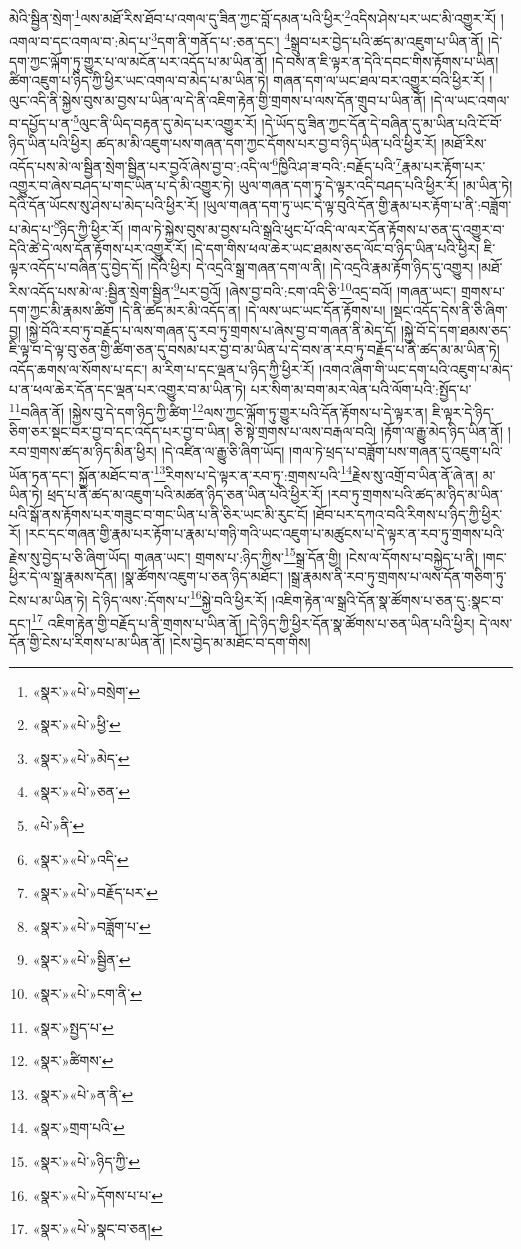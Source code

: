 མེའི་སྦྱིན་སྲེག་\footnote{«སྣར་»«པེ་»བསྲེག་}ལས་མཐོ་རིས་ཐོབ་པ་འགལ་དུ་ཟིན་ཀྱང་བློ་དམན་པའི་ཕྱིར་\footnote{«སྣར་»«པེ་»ཕྱི་}འདིས་ཤེས་པར་ཡང་མི་འགྱུར་རོ། །འགལ་བ་དང་འགལ་བ་:མེད་པ་\footnote{«སྣར་»«པེ་»མེད་}དག་ནི་གནོད་པ་:ཅན་དང་། \footnote{«སྣར་»«པེ་»ཅན་}སྒྲུབ་པར་བྱེད་པའི་ཚད་མ་འཇུག་པ་ཡིན་ནོ། །དེ་དག་ཀྱང་ལྐོག་ཏུ་གྱུར་པ་ལ་མངོན་པར་འདོད་པ་མ་ཡིན་ནོ། །དེ་བས་ན་ཇི་ལྟར་ན་དེའི་དབང་གིས་རྟོགས་པ་ཡིན། ཚིག་འཇུག་པ་ཉིད་ཀྱི་ཕྱིར་ཡང་འགལ་བ་མེད་པ་མ་ཡིན་ཏེ། གཞན་དག་ལ་ཡང་ཐལ་བར་འགྱུར་བའི་ཕྱིར་རོ། །ལུང་འདི་ནི་སྐྱེས་བུས་མ་བྱས་པ་ཡིན་ལ་དེ་ནི་འཇིག་རྟེན་གྱི་གྲགས་པ་ལས་དོན་གྲུབ་པ་ཡིན་ནོ། །དེ་ལ་ཡང་འགལ་བ་དཔྱོད་པ་ན་\footnote{«པེ་»ནི་}ལུང་ནི་ཡིད་བརྟན་དུ་མེད་པར་འགྱུར་རོ། །དེ་ཡོད་དུ་ཟིན་ཀྱང་དོན་དེ་བཞིན་དུ་མ་ཡིན་པའི་ངོ་བོ་ཉིད་ཡིན་པའི་ཕྱིར། ཚད་མ་མི་འཇུག་པས་གཞན་དག་ཀྱང་དོགས་པར་བྱ་བ་ཉིད་ཡིན་པའི་ཕྱིར་རོ། །མཐོ་རིས་འདོད་པས་མེ་ལ་སྦྱིན་སྲེག་སྦྱིན་པར་བྱའོ་ཞེས་བྱ་བ་:འདི་ལ་\footnote{«སྣར་»«པེ་»འདི་}ཁྱིའི་ཤ་ཟ་བའི་:བརྗོད་པའི་\footnote{«སྣར་»«པེ་»བརྗོད་པར་}རྣམ་པར་རྟོག་པར་འགྱུར་བ་ཞེས་བཤད་པ་གང་ཡིན་པ་དེ་མི་འགྱུར་ཏེ། ཡུལ་གཞན་དག་ཏུ་དེ་ལྟར་འདི་བཤད་པའི་ཕྱིར་རོ། །མ་ཡིན་ཏེ། དེའི་དོན་ཡོངས་སུ་ཤེས་པ་མེད་པའི་ཕྱིར་རོ། །ཡུལ་གཞན་དག་ཏུ་ཡང་དེ་ལྟ་བུའི་དོན་གྱི་རྣམ་པར་རྟོག་པ་ནི་:བཟློག་པ་མེད་པ་\footnote{«སྣར་»«པེ་»བཟློག་པ་}ཉིད་ཀྱི་ཕྱིར་རོ། །གལ་ཏེ་སྐྱེས་བུས་མ་བྱས་པའི་སྒྲའི་ཕུང་པོ་འདི་ལ་ལར་དོན་རྟོགས་པ་ཅན་དུ་འགྱུར་བ་དེའི་ཚེ་དེ་ལས་དོན་རྟོགས་པར་འགྱུར་རོ། །དེ་དག་གིས་ཕལ་ཆེར་ཡང་ཐམས་ཅད་ལོང་བ་ཉིད་ཡིན་པའི་ཕྱིར། ཇི་ལྟར་འདོད་པ་བཞིན་དུ་བྱེད་དོ། །དེའི་ཕྱིར། དེ་འདྲའི་སྒྲ་གཞན་དག་ལ་ནི། །དེ་འདྲའི་རྣམ་རྟོག་ཉིད་དུ་འགྱུར། །མཐོ་རིས་འདོད་པས་མེ་ལ་:སྦྱིན་སྲེག་སྦྱིན་\footnote{«སྣར་»«པེ་»སྦྱིན་}པར་བྱའོ། །ཞེས་བྱ་བའི་:ངག་འདི་ཅི་\footnote{«སྣར་»«པེ་»ངག་ནི་}འདྲ་བའོ། །གཞན་ཡང་། གྲགས་པ་དག་ཀྱང་མི་རྣམས་ཚིག །དེ་ནི་ཚད་མར་མི་འདོད་ན། །དེ་ལས་ཡང་ཡང་དོན་རྟོགས་པ། །སྡང་འདོད་དེས་ནི་ཅི་ཞིག་བྱ། །སྐྱེ་བོའི་རབ་ཏུ་བརྗོད་པ་ལས་གཞན་དུ་རབ་ཏུ་གྲགས་པ་ཞེས་བྱ་བ་གཞན་ནི་མེད་དོ། །སྐྱེ་བོ་དེ་དག་ཐམས་ཅད་ཇི་ལྟ་བ་དེ་ལྟ་བུ་ཅན་གྱི་ཚིག་ཅན་དུ་བསམ་པར་བྱ་བ་མ་ཡིན་པ་དེ་བས་ན་རབ་ཏུ་བརྗོད་པ་ནི་ཚད་མ་མ་ཡིན་ཏེ། འདོད་ཆགས་ལ་སོགས་པ་དང་། མ་རིག་པ་དང་ལྡན་པ་ཉིད་ཀྱི་ཕྱིར་རོ། །འགའ་ཞིག་གི་ཡང་དག་པའི་འཇུག་པ་མེད་པ་ན་ཕལ་ཆེར་དོན་དང་ལྡན་པར་འགྱུར་བ་མ་ཡིན་ཏེ། པར་སིག་མ་བག་མར་ལེན་པའི་ལོག་པའི་:སྤྱོད་པ་\footnote{«སྣར་»སྤྱད་པ་}བཞིན་ནོ། །སྐྱེས་བུ་དེ་དག་ཉིད་ཀྱི་ཚིག་\footnote{«སྣར་»ཚིགས་}ལས་ཀྱང་ལྐོག་ཏུ་གྱུར་པའི་དོན་རྟོགས་པ་དེ་ལྟར་ན། ཇི་ལྟར་དེ་ཉིད་ཅིག་ཅར་སྡང་བར་བྱ་བ་དང་འདོད་པར་བྱ་བ་ཡིན། ཅི་སྟེ་གྲགས་པ་ལས་བརྒལ་བའི། །རྟོག་ལ་རྒྱུ་མེད་ཉིད་ཡིན་ནོ། །རབ་གྲགས་ཚད་མ་ཉིད་མིན་ཕྱིར། །དེ་འཛིན་ལ་རྒྱུ་ཅི་ཞིག་ཡོད། །གལ་ཏེ་ཕྲད་པ་བཟློག་པས་གཞན་དུ་འཇུག་པའི་ཡོན་ཏན་དང་། སྐྱོན་མཐོང་བ་ན་\footnote{«སྣར་»«པེ་»ན་ནི་}རིགས་པ་དེ་ལྟར་ན་རབ་ཏུ་:གྲགས་པའི་\footnote{«སྣར་»གྲག་པའི་}རྗེས་སུ་འགྲོ་བ་ཡིན་ནོ་ཞེ་ན། མ་ཡིན་ཏེ། ཕྲད་པ་ནི་ཚད་མ་འཇུག་པའི་མཚན་ཉིད་ཅན་ཡིན་པའི་ཕྱིར་རོ། །རབ་ཏུ་གྲགས་པའི་ཚད་མ་ཉིད་མ་ཡིན་པའི་སྒོ་ནས་རྟོགས་པར་གཟུང་བ་གང་ཡིན་པ་ནི་ཅིར་ཡང་མི་རུང་ངོ། །ཐོབ་པར་དཀའ་བའི་རིགས་པ་ཉིད་ཀྱི་ཕྱིར་རོ། །རང་དང་གཞན་གྱི་རྣམ་པར་རྟོག་པ་རྣམ་པ་གཉི་གའི་ཡང་འཇུག་པ་མཚུངས་པ་དེ་ལྟར་ན་རབ་ཏུ་གྲགས་པའི་རྗེས་སུ་བྱེད་པ་ཅི་ཞིག་ཡོད། གཞན་ཡང་། གྲགས་པ་:ཉིད་ཀྱིས་\footnote{«སྣར་»«པེ་»ཉིད་ཀྱི་}སྒྲ་དོན་གྱི། །ངེས་ལ་དོགས་པ་བསྐྱེད་པ་ནི། །གང་ཕྱིར་དེ་ལ་སྒྲ་རྣམས་དོན། །སྣ་ཚོགས་འཇུག་པ་ཅན་ཉིད་མཐོང་། །སྒྲ་རྣམས་ནི་རབ་ཏུ་གྲགས་པ་ལས་དོན་གཅིག་ཏུ་ངེས་པ་མ་ཡིན་ཏེ། དེ་ཉིད་ལས་:དོགས་པ་\footnote{«སྣར་»«པེ་»དོགས་པ་པ་}སྐྱེ་བའི་ཕྱིར་རོ། །འཇིག་རྟེན་ལ་སྒྲའི་དོན་སྣ་ཚོགས་པ་ཅན་དུ་:སྣང་བ་དང་།\footnote{«སྣར་»«པེ་»སྣང་བ་ཅན།} འཇིག་རྟེན་གྱི་བརྗོད་པ་ནི་གྲགས་པ་ཡིན་ནོ། །དེ་ཉིད་ཀྱི་ཕྱིར་དོན་སྣ་ཚོགས་པ་ཅན་ཡིན་པའི་ཕྱིར། དེ་ལས་དོན་གྱི་ངེས་པ་རིགས་པ་མ་ཡིན་ནོ། །ངེས་བྱེད་མ་མཐོང་བ་དག་གིས། 